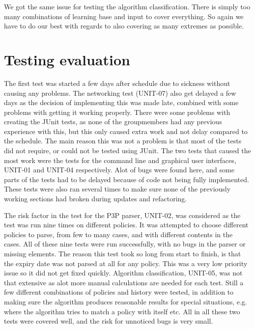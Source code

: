 We got the same issue for testing the algorithm classification. There is simply too many combinations of learning base and input to cover everything. So again we have to do our best with regards to also covering as many extremes as possible.

\section{Testing evaluation}
The first test was started a few days after schedule due to sickness without causing any problems. The networking test (UNIT-07) also get delayed a few days as the decision of implementing this was made late, combined with some problems with getting it working properly. There were  some problems with creating the JUnit tests, as none of the groupmembers had any previous experience with this, but this only caused extra work and not delay compared to the schedule. The main reason this was not a problem is that most of the tests did not require, or could not be tested using JUnit. The two tests that caused the most work were the tests for the command line and graphical user interfaces, UNIT-01 and UNIT-04 respectively. Alot of bugs were found here, and some parts of the tests had to be delayed because of code not being fully implemented. These tests were also ran several times to make sure none of the previously working sections had broken during updates and refactoring.

The risk factor in the test for the P3P parser, UNIT-02, was considered as the test was run nine times on different policies. It was attempted to choose different policies to parse, from few to many cases, and with different contents in the cases. All of these nine tests were run successfully, with no bugs in the parser or missing elements. The reason this test took so long from start to finish, is that the expiry date was not parsed at all for any policy. This was a very low priority issue so it did not get fixed quickly.
Algorithm classification, UNIT-05, was not that extensive as alot more manual calculations are needed for each test. Still a few different combinations of policies and history were tested, in addition to making sure the algorithm produces reasonable results for special situations, e.g. where the algorithm tries to match a policy with itself etc.
All in all these two tests were covered well, and the risk for unnoticed bugs is very small.
